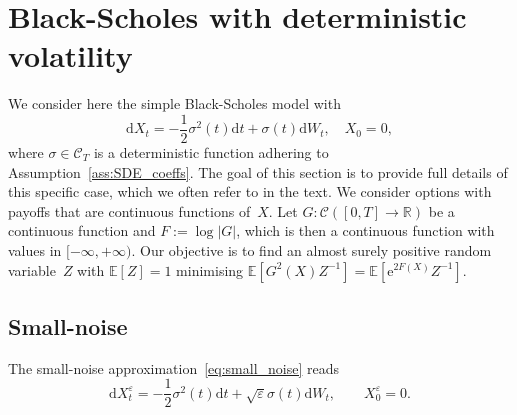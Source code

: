 \documentclass{amsart}[11pt]
\numberwithin{equation}{section}
\numberwithin{theorem}{subsection}
\numberwithin{proposition}{subsection}
\numberwithin{definition}{subsection}
\numberwithin{lemma}{subsection}
\numberwithin{assumption}{subsection}
\newcommand{\Cc}{\mathcal{C}}
\newcommand{\RR}{\mathbb{R}}
\newcommand{\EE}{\mathbb{E}}
\newcommand{\D}{\mathrm{d}}
\newcommand{\E}{\mathrm{e}}
\newcommand{\eps}{\varepsilon}
\begin{document}
\section{Black-Scholes with deterministic volatility}\label{sec:BS}
\small{
We consider here the simple Black-Scholes model with 
$$
\D X_t = -\frac{1}{2}\sigma^2(t) \D t + \sigma(t) \D W_t, \quad X_0 = 0,
$$
where $\sigma\in \Cc_T$ is a deterministic function adhering to Assumption~\ref{ass:SDE_coeffs}. 
The goal of this section is to provide full details of this specific case, 
which we often refer to in the text.
We consider options with payoffs that are continuous functions of~$X$. 
Let $G:\Cc([0,T]\to \RR)$ be a continuous function and $F := \log|G|$, 
which is then a continuous function with values in $[-\infty,+\infty)$. %
Our objective is to find an almost surely positive random variable~$Z$ with $\EE[Z] = 1$ minimising $\EE[G^2(X)Z^{-1}] = \EE\left[\E^{2F(X)}Z^{-1}\right]$.

\subsection{Small-noise}
The small-noise approximation~\eqref{eq:small_noise} reads
$$
\D X_t^{\eps} = -\frac{1}{2}\sigma^2(t)\D t + \sqrt{\eps}\sigma(t) \D W_t, \qquad X_0 ^{\eps} = 0.
$$

}
\end{document}
